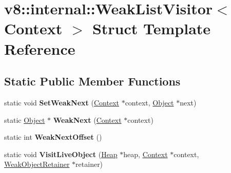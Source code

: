 \hypertarget{structv8_1_1internal_1_1_weak_list_visitor_3_01_context_01_4}{}\section{v8\+:\+:internal\+:\+:Weak\+List\+Visitor$<$ Context $>$ Struct Template Reference}
\label{structv8_1_1internal_1_1_weak_list_visitor_3_01_context_01_4}
\subsection*{Static Public Member Functions}
\begin{DoxyCompactItemize}
\item 
static void {\bfseries Set\+Weak\+Next} (\hyperlink{classv8_1_1internal_1_1_context}{Context} $\ast$context, \hyperlink{classv8_1_1internal_1_1_object}{Object} $\ast$next)\hypertarget{structv8_1_1internal_1_1_weak_list_visitor_3_01_context_01_4_a8d6612357cd36ed1abbae7a22f14d656}{}\label{structv8_1_1internal_1_1_weak_list_visitor_3_01_context_01_4_a8d6612357cd36ed1abbae7a22f14d656}

\item 
static \hyperlink{classv8_1_1internal_1_1_object}{Object} $\ast$ {\bfseries Weak\+Next} (\hyperlink{classv8_1_1internal_1_1_context}{Context} $\ast$context)\hypertarget{structv8_1_1internal_1_1_weak_list_visitor_3_01_context_01_4_a9accaaff604cd777da03adbb170702ec}{}\label{structv8_1_1internal_1_1_weak_list_visitor_3_01_context_01_4_a9accaaff604cd777da03adbb170702ec}

\item 
static int {\bfseries Weak\+Next\+Offset} ()\hypertarget{structv8_1_1internal_1_1_weak_list_visitor_3_01_context_01_4_a1151b6139cd58c988d50855aebdbb729}{}\label{structv8_1_1internal_1_1_weak_list_visitor_3_01_context_01_4_a1151b6139cd58c988d50855aebdbb729}

\item 
static void {\bfseries Visit\+Live\+Object} (\hyperlink{classv8_1_1internal_1_1_heap}{Heap} $\ast$heap, \hyperlink{classv8_1_1internal_1_1_context}{Context} $\ast$context, \hyperlink{classv8_1_1internal_1_1_weak_object_retainer}{Weak\+Object\+Retainer} $\ast$retainer)\hypertarget{structv8_1_1internal_1_1_weak_list_visitor_3_01_context_01_4_a124739c0e7ba194e78f3cefc039c9c43}{}\label{structv8_1_1internal_1_1_weak_list_visitor_3_01_context_01_4_a124739c0e7ba194e78f3cefc039c9c43}


\end{DoxyCompactItemize}
